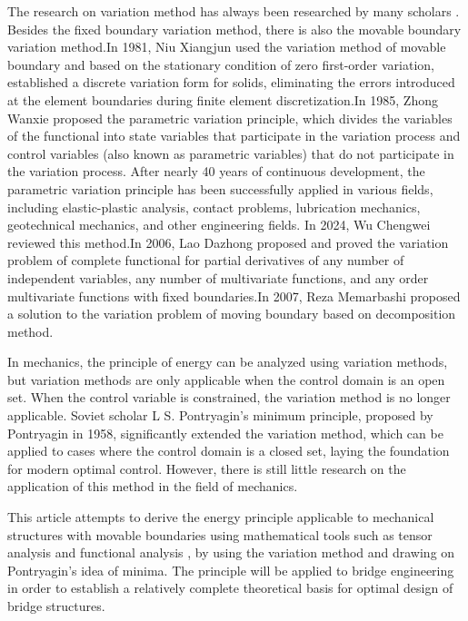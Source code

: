 The research on variation method has always been researched by many scholars \cite{penghaijun2011,zhanghongwu2006, reza2007, longyuqiu1987}. Besides the fixed boundary variation method, there is also the movable boundary variation method.In 1981, Niu Xiangjun \cite{niuxiangjun1981} used the variation method of movable boundary and based on the stationary condition of zero first-order variation, established a discrete variation form for solids, eliminating the errors introduced at the element boundaries during finite element discretization.In 1985, Zhong Wanxie \cite{zhongwanxie1997} proposed the parametric variation principle, which divides the variables of the functional into state variables that participate in the variation process and control variables (also known as parametric variables) that do not participate in the variation process. After nearly 40 years of continuous development, the parametric variation principle has been successfully applied in various fields, including elastic-plastic analysis, contact problems, lubrication mechanics, geotechnical mechanics, and other engineering fields. In 2024, Wu Chengwei \cite{wuchengwei2024} reviewed this method.In 2006, Lao Dazhong \cite{laodazhong2011} proposed and proved the variation problem of complete functional for partial derivatives of any number of independent variables, any number of multivariate functions, and any order multivariate functions with fixed boundaries.In 2007, Reza Memarbashi proposed a solution to the variation problem of moving boundary based on decomposition method.

In mechanics, the principle of energy can be analyzed using variation methods, but variation methods are only applicable when the control domain is an open set. When the control variable is constrained, the variation method is no longer applicable. Soviet scholar L S. Pontryagin's minimum principle, proposed by Pontryagin in 1958, significantly extended the variation method, which can be applied to cases where the control domain is a closed set, laying the foundation for modern optimal control. However, there is still little research on the application of this method in the field of mechanics.



This article attempts to derive the energy principle applicable to mechanical structures with movable boundaries using mathematical tools such as tensor analysis \cite{huangkezhi2020} and functional analysis \cite{sunjiong2018, liuzhongkan1986}, by using the variation method and drawing on Pontryagin's idea of minima. The principle will be applied to bridge engineering in order to establish a relatively complete theoretical basis for optimal design of bridge structures.





